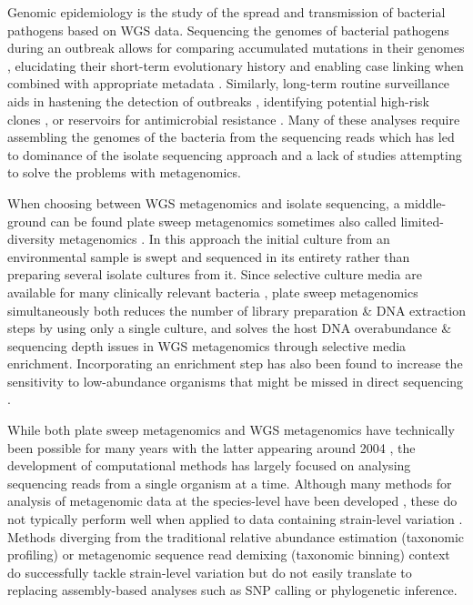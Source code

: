 \documentclass[officiallayout]{tktla}
\begin{document}
Genomic epidemiology is the study of the spread and transmission of
bacterial pathogens based on WGS data. Sequencing the genomes of
bacterial pathogens during an outbreak allows for comparing
accumulated mutations in their genomes \citep{tang2017infection},
elucidating their short-term evolutionary history and enabling case
linking when combined with appropriate metadata
\citep{grad2014epidemiologic, hill2021progress}. Similarly, long-term
routine surveillance aids in hastening the detection of outbreaks
\citep{eyre2012pilot, gardy2018towards}, identifying potential
high-risk clones \citep{aanensen2016whole}, or reservoirs for
antimicrobial resistance \citep{weingarten2018genomic,
  coipan2020genomic}. Many of these analyses require assembling the
genomes of the bacteria from the sequencing reads which has led to
dominance of the isolate sequencing approach and a lack of studies
attempting to solve the problems with metagenomics.

When choosing between WGS metagenomics and isolate sequencing, a
middle-ground can be found plate sweep metagenomics
\cite{maklin_high-resolution_2021} \textemdash{ } sometimes also called
limited-diversity metagenomics \citep{cocker_drivers_2022}. In this
approach the initial culture from an environmental sample is swept
and sequenced in its entirety rather than preparing several isolate
cultures from it. Since selective culture media are available for many
clinically relevant bacteria \citep{lagier2015current}, plate sweep
metagenomics simultaneously both reduces the number of library
preparation \& DNA extraction steps by using only a single culture,
and solves the host DNA overabundance \& sequencing depth issues in
WGS metagenomics through selective media enrichment. Incorporating an
enrichment step has also been found to increase the sensitivity to
low-abundance organisms that might be missed in direct sequencing
\citep{whelan2020culture}.

While both plate sweep metagenomics and WGS metagenomics have
technically been possible for many years with the latter appearing
around 2004 \citep{tyson2004community, venter2004environmental}, the
development of computational methods has largely focused on analysing
sequencing reads from a single organism at a time. Although many
methods for analysis of metagenomic data at the species-level have
been developed \citep{breitwieser2019review}, these do not typically
perform well when applied to data containing strain-level variation
\citep{sczyrba2017critical}. Methods diverging from the traditional
relative abundance estimation (taxonomic profiling)
\citep{truong2017microbial} or metagenomic sequence read demixing
(taxonomic binning) \citep{van2022strainge} context do successfully
tackle strain-level variation but do not easily translate to replacing
assembly-based analyses such as SNP calling or phylogenetic inference.
\end{document}
